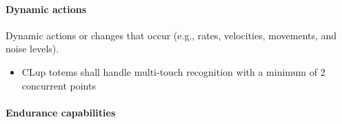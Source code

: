 \paragraph{Dynamic actions}
\label{par:dynamicActions}
Dynamic actions or changes that occur (e.g., rates, velocities, movements, and noise levels).
\begin{itemize}[leftmargin=+.8in]
    \item [\ref{par:dynamicActions}.1.1] CLup totems shall handle multi-touch recognition with a minimum of 2 concurrent points
\end{itemize}

\paragraph{Endurance capabilities}
\label{par:endurance}

